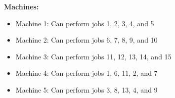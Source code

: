 %
%
%
%
%

\textbf{Machines:}
\begin{itemize}
    \item Machine 1: Can perform jobs 1, 2, 3, 4, and 5
    \item Machine 2: Can perform jobs 6, 7, 8, 9, and 10
    \item Machine 3: Can perform jobs 11, 12, 13, 14, and 15
    \item Machine 4: Can perform jobs 1, 6, 11, 2, and 7
    \item Machine 5: Can perform jobs 3, 8, 13, 4, and 9
\end{itemize}


